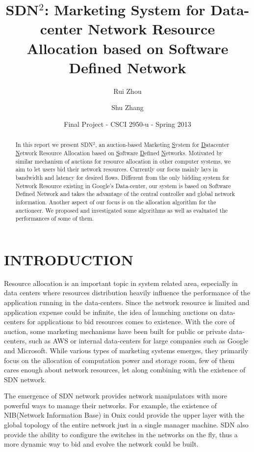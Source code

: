 \documentclass[a4paper,11pt,twocolumn]{article}
\begin{document}
\tableofcontents


\title{SDN$^{2}$: Marketing System for Data-center Network Resource Allocation based on Software Defined Network}
\author{Rui Zhou \and Shu Zhang}
\date{Final Project - CSCI 2950-u - Spring 2013}
\maketitle

\begin{abstract}
In this report we present SDN$^{2}$, an auction-based Marketing \underline{S}ystem for \underline{D}atacenter \underline{N}etwork Resource Allocation based on \underline{S}oftware \underline{D}efined \underline{N}etworks.
Motivated by similar mechanism of auctions for resource allocation in other computer systems, we aim to 
let users bid their network resources. Currently our focus mainly lays in bandwidth and latency for desired flows. Different from the only   
bidding system for Network Resource existing in Google's Data-center\cite{google}, our system is based on Software Defined Network and takes the advantage
of the central controller and global network information. 
Another aspect of our focus is on the allocation algorithm for the auctioneer. We proposed and investigated some 
algorithms as well as evaluated the performances of some of them. 
\end{abstract}

\section{INTRODUCTION}
Resource allocation is an important topic in system related area, especially in data centers where   resources distribution heavily influence the performance 
of the application running in the data-centers. Since the network resource is limited and application expense could be infinite, the idea of launching auctions on
data-centers for applications to bid resources comes to existence. With the core of auction, some marketing mechanisms have been built for public or 
private data-centers, such as AWS\cite{aws} or internal data-centers for large companies such as Google and Microsoft. While various types of marketing systems
emerges, they primarily focus on the allocation of computation power and storage room, few of them cares enough about network resources, let along combining with the existence of SDN network. 

The emergence of SDN network   provides network manipulators with more powerful 
ways to manage their networks. For example, the existence of NIB(Network Information Base) in Onix\cite{onix} could provide the upper layer with the global
topology of the entire network just in a single manager machine.  SDN also provide the ability to configure the switches in the networks on the fly, thus a more dynamic way to bid and evolve the network could be built.
\end{document}
